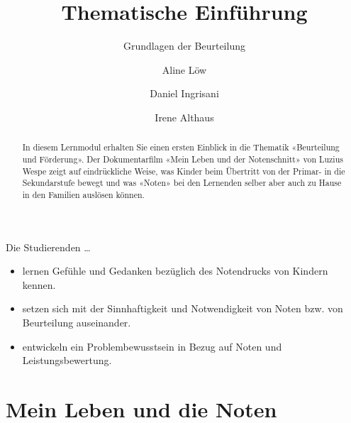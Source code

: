 \documentclass[
  10pt,
  a4paper,
  DIV=11]{scrartcl}
\title{Thematische Einführung}
\subtitle{Grundlagen der Beurteilung}
\author{Aline Löw \and Daniel Ingrisani \and Irene Althaus}
\date{}
\providecommand{\tightlist}{%
  \setlength{\itemsep}{0pt}\setlength{\parskip}{0pt}}\usepackage{longtable,booktabs,array}
\begin{document}
\maketitle
\begin{abstract}
In diesem Lernmodul erhalten Sie einen ersten Einblick in die Thematik
«Beurteilung und Förderung». Der Dokumentarfilm «Mein Leben und der
Notenschnitt» von Luzius Wespe zeigt auf eindrückliche Weise, was Kinder
beim Übertritt von der Primar- in die Sekundarstufe bewegt und was
«Noten» bei den Lernenden selber aber auch zu Hause in den Familien
auslösen können.
\end{abstract}

\begin{tcolorbox}[enhanced jigsaw, title=\textcolor{quarto-callout-note-color}{\faInfo}\hspace{0.5em}{Ziele des Lernmoduls}, colframe=quarto-callout-note-color-frame, colbacktitle=quarto-callout-note-color!10!white, left=2mm, leftrule=.75mm, arc=.35mm, toptitle=1mm, bottomrule=.15mm, breakable, opacityback=0, bottomtitle=1mm, coltitle=black, titlerule=0mm, opacitybacktitle=0.6, rightrule=.15mm, colback=white, toprule=.15mm]

Die Studierenden \ldots{}

\begin{itemize}
\tightlist
\item
  lernen Gefühle und Gedanken bezüglich des Notendrucks von Kindern
  kennen.
\item
  setzen sich mit der Sinnhaftigkeit und Notwendigkeit von Noten bzw.
  von Beurteilung auseinander.
\item
  entwickeln ein Problembewusstsein in Bezug auf Noten und
  Leistungsbewertung.
\end{itemize}

\end{tcolorbox}

\section{Mein Leben und die Noten}\label{mein-leben-und-die-noten}
\end{document}
